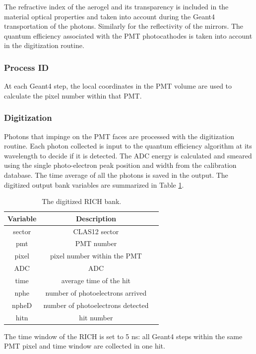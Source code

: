 The refractive index of the aerogel and its transparency is included in the material optical properties and taken
into account during the Geant4 transportation of the photons.
Similarly for the reflectivity of the mirrors. The quantum efficiency associated with the PMT photocathodes is taken into account in the digitization routine.

\subsubsection{Process ID}
At each Geant4 step, the local coordinates in the PMT volume are used to calculate the pixel number within that PMT.

\subsubsection{Digitization}

Photons that impinge on the PMT faces are processed with the digitization routine.
Each photon collected is input to the quantum efficiency algorithm at its wavelength to decide if it is detected.
The ADC energy is calculated and smeared using the single photo-electron peak position and width from the calibration database.
The time average of all the photons is saved in the output.
The digitized output bank variables are summarized in Table \ref{tab:richBank}.

\begin{table}[h]
	\begin{center}
		\begin{tabular}{| c | c | c |}
			\hline \hline
			Variable & Description                                         \\
			\hline
             sector  &                                     CLAS12 sector   \\
                pmt  &                                        PMT number   \\
              pixel  &                       pixel number within the PMT   \\
                ADC  &                                               ADC   \\
               time  &                           average time of the hit   \\
               nphe  &                  number of photoelectrons arrived   \\
              npheD  &                 number of photoelectrons detected   \\
               hitn  &                                        hit number   \\
			\hline \hline
		\end{tabular}
	\end{center}
	\caption{The digitized RICH bank.}\label{tab:richBank}
\end{table}

The time window  of the RICH is set to 5 ns: all Geant4 steps within the same PMT pixel and time window are collected in one hit.
